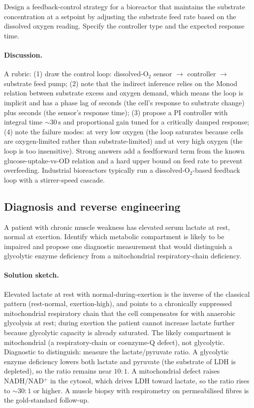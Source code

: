 \begin{exercise}
Design a feedback-control strategy for a bioreactor that maintains
the substrate concentration at a setpoint by adjusting the substrate
feed rate based on the dissolved oxygen reading. Specify the
controller type and the expected response time.
\end{exercise}

\paragraph{Discussion.}
A rubric: (1) draw the control loop: dissolved-O$_2$ sensor $\to$
controller $\to$ substrate feed pump; (2) note that the indirect
inference relies on the Monod relation between substrate excess and
oxygen demand, which means the loop is implicit and has a phase lag
of seconds (the cell's response to substrate change) plus seconds
(the sensor's response time); (3) propose a PI controller with
integral time $\sim 30\,\text{s}$ and proportional gain tuned for a
critically damped response; (4) note the failure modes: at very low
oxygen (the loop saturates because cells are oxygen-limited rather
than substrate-limited) and at very high oxygen (the loop is too
insensitive). Strong answers add a feedforward term from the known
glucose-uptake-vs-OD relation and a hard upper bound on feed rate to
prevent overfeeding. Industrial bioreactors typically run a
dissolved-O$_2$-based feedback loop with a stirrer-speed cascade.

\subsection*{Diagnosis and reverse engineering}

\begin{exercise}
A patient with chronic muscle weakness has elevated serum lactate at
rest, normal at exertion. Identify which metabolic compartment is
likely to be impaired and propose one diagnostic measurement that
would distinguish a glycolytic enzyme deficiency from a mitochondrial
respiratory-chain deficiency.
\end{exercise}

\paragraph{Solution sketch.}
Elevated lactate at rest with normal-during-exertion is the inverse
of the classical pattern (rest-normal, exertion-high), and points to
a chronically suppressed mitochondrial respiratory chain that the
cell compensates for with anaerobic glycolysis at rest; during
exertion the patient cannot increase lactate further because
glycolytic capacity is already saturated. The likely compartment is
mitochondrial (a respiratory-chain or coenzyme-Q defect), not
glycolytic. Diagnostic to distinguish: measure the lactate/pyruvate
ratio. A glycolytic enzyme deficiency lowers both lactate and
pyruvate (the substrate of LDH is depleted), so the ratio remains
near $10:1$. A mitochondrial defect raises NADH/NAD$^+$ in the
cytosol, which drives LDH toward lactate, so the ratio rises to
$\sim 30:1$ or higher. A muscle biopsy with respirometry on
permeabilised fibres is the gold-standard follow-up.

